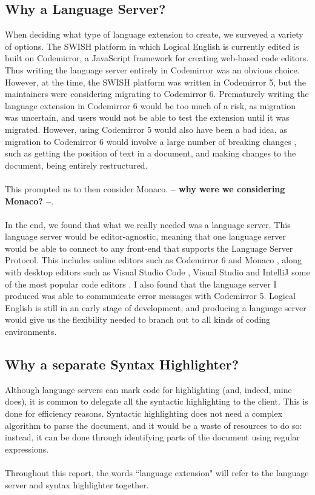 \documentclass[../main.tex]{subfiles}
\begin{document}
\subsection{Why a Language Server?}
When deciding what type of language extension to create, we surveyed a variety of options. The SWISH platform in which Logical English is currently edited is built on Codemirror, a JavaScript framework for creating web-based code editors. Thus writing the language server entirely in Codemirror was an obvious choice. However, at the time, the SWISH platform was written in Codemirror 5, but the maintainers were considering migrating to Codemirror 6. Prematurely writing the language extension in Codemirror 6 would be too much of a risk, as migration was uncertain, and users would not be able to test the extension until it was migrated. However, using Codemirror 5 would also have been a bad idea, as migration to Codemirror 6 would involve a large number of breaking changes \cite{codemirror_migration}, such as getting the position of text in a document, and making changes to the document, being entirely restructured.\\ \\ 
This prompted us to then consider Monaco. \textbf{-- why were we considering Monaco? --}.
\\ \\ 
In the end, we found that what we really needed was a language server. This language server would be editor-agnostic, meaning that one language server would be able to connect to any front-end that supports the Language Server Protocol. This includes online editors such as Codemirror 6 \cite{codemirror_6_language_server} and Monaco \cite{monaco_language_server}, along with desktop editors such as Visual Studio Code \cite{vsc_langserver_docs}, Visual Studio \cite{visual_studio_language_server} and IntelliJ \cite{intellij_language_server} some of the most popular code editors \cite{ide_rankings}. I also found that the language server I produced was able to communicate error messages with Codemirror 5. Logical English is still in an early stage of development, and producing a language server would give us the flexibility needed to branch out to all kinds of coding environments.

\subsection{Why a separate Syntax Highlighter?}
Although language servers can mark code for highlighting (and, indeed, mine does), it is common to delegate all the syntactic highlighting to the client. This is done for efficiency reasons. Syntactic highlighting does not need a complex algorithm to parse the document, and it would be a waste of resources to do so: instead, it can be done through identifying parts of the document using regular expressions. 
\\ 
\\
Throughout this report, the words ``language extension" will refer to the language server and syntax highlighter together.
\end{document}
